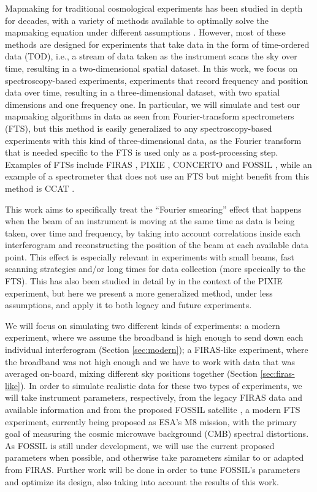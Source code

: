 \documentclass{aa}
\begin{document}
Mapmaking for traditional cosmological experiments has been studied in depth for decades, with a variety of methods available to optimally solve the mapmaking equation under different assumptions \citep{tegmark1997, natoli2001, keihanen2005, stompor2008, patanchon2008}. However, most of these methods are designed for experiments that take data in the form of time-ordered data (TOD), i.e., a stream of data taken as the instrument scans the sky over time, resulting in a two-dimensional spatial dataset. In this work, we focus on spectroscopy-based experiments, experiments that record frequency and position data over time, resulting in a three-dimensional dataset, with two spatial dimensions and one frequency one. In particular, we will simulate and test our mapmaking algorithms in data as seen from Fourier-transform spectrometers (FTS), but this method is easily generalized to any spectroscopy-based experiments with this kind of three-dimensional data, as the Fourier transform that is needed specific to the FTS is used only as a post-processing step. Examples of FTSs include FIRAS \citep{fixsen:1994,mather:1999}, PIXIE \citep{kogut:2011}, CONCERTO \citep{Hu_2024} and FOSSIL \citep{coulon2024}, while an example of a spectrometer that does not use an FTS but might benefit from this method is CCAT \citep{CCAT_Prime_Collaboration_2022}.

This work aims to specifically treat the ``Fourier smearing'' effect that happens when the beam of an instrument is moving at the same time as data is being taken, over time and frequency, by taking into account correlations inside each interferogram and reconstructing the position of the beam at each available data point. This effect is especially relevant in experiments with small beams, fast scanning strategies and/or long times for data collection (more specically to the FTS). This has also been studied in detail by \cite{naess2019} in the context of the PIXIE experiment, but here we present a more generalized method, under less assumptions, and apply it to both legacy and future experiments.

We will focus on simulating two different kinds of experiments: a modern experiment, where we assume the broadband is high enough to send down each individual interferogram (Section \ref{sec:modern}); a FIRAS-like experiment, where the broadband was not high enough and we have to work with data that was averaged on-board, mixing different sky positions together (Section \ref{sec:firas-like}). In order to simulate realistic data for these two types of experiments, we will take instrument parameters, respectively, from the legacy FIRAS data and available information and from the proposed FOSSIL satellite \citep{coulon2024}, a modern FTS experiment, currently being proposed as ESA's M8 mission, with the primary goal of measuring the cosmic microwave background (CMB) spectral distortions. As FOSSIL is still under development, we will use the current proposed parameters when possible, and otherwise take parameters similar to or adapted from FIRAS. Further work will be done in order to tune FOSSIL's parameters and optimize its design, also taking into account the results of this work.
\end{document}
